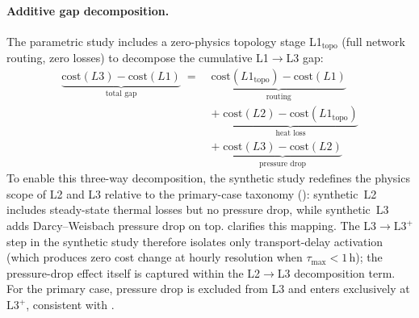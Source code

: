 \documentclass[a4paper,fleqn]{cas-dc}
\newcommand{\Lplus}{\mathrm{L3}^{+}}
\begin{document}
\paragraph{Additive gap decomposition.}
The parametric study includes a zero-physics topology stage
L1$_{\mathrm{topo}}$ (full network routing, zero losses) to
decompose the cumulative L1$\to$L3 gap:
%
\begin{equation}
\label{eq:cost_decomposition}
\begin{split}
  \underbrace{\mathrm{cost}(L3) - \mathrm{cost}(L1)}_{\text{total gap}}
  \;=\;&
  \underbrace{\mathrm{cost}(L1_{\mathrm{topo}}) - \mathrm{cost}(L1)}_{\text{routing}} \\[6pt]
  &+\;
  \underbrace{\mathrm{cost}(L2) - \mathrm{cost}(L1_{\mathrm{topo}})}_{\text{heat loss}} \\[6pt]
  &+\;
  \underbrace{\mathrm{cost}(L3) - \mathrm{cost}(L2)}_{\text{pressure drop}}
\end{split}
\end{equation}
%
To enable this three-way decomposition, the synthetic study
redefines the physics scope of L2 and L3 relative to the
primary-case taxonomy (): synthetic~L2
includes steady-state thermal losses but no pressure drop,
while synthetic~L3 adds Darcy--Weisbach pressure drop on top.
 clarifies this mapping.
The L3$\to\Lplus$ step in the synthetic study therefore
isolates only transport-delay activation (which produces zero
cost change at hourly resolution when
$\tau_{\max} < 1$\,h); the pressure-drop effect itself is
captured within the L2$\to$L3 decomposition term. For the
primary case, pressure drop is excluded from L3 and enters
exclusively at $\Lplus$, consistent with
.
\end{document}
